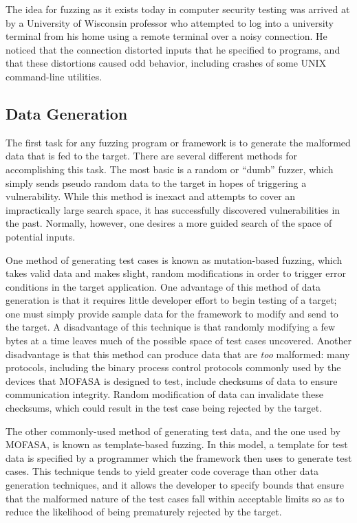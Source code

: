 \documentclass{report}
\begin{document}
The idea for fuzzing as it exists today in computer security testing was arrived at by a University of Wisconsin professor who
attempted to log into a university terminal from his home using a remote terminal over a noisy connection. He noticed that the
connection distorted inputs that he specified to programs, and that these distortions caused odd behavior, including crashes
of some UNIX command-line utilities.

\subsection{Data Generation}
The first task for any fuzzing program or framework is to generate the malformed data that is fed to the target.
There are several different methods for accomplishing this task. The most basic is a random or ``dumb'' fuzzer,
which simply sends pseudo random data to the target in hopes of triggering a vulnerability. While this method
is inexact and attempts to cover an impractically large search space, it has successfully discovered vulnerabilities
in the past. Normally, however, one desires a more guided search of the space of potential inputs. 

One method of generating test cases is known as mutation-based fuzzing, which takes valid data and makes slight, 
random modifications in order to trigger error conditions in the target application. One advantage of this method
of data generation is that it requires little developer effort to begin testing of a target; one must simply provide
sample data for the framework to modify and send to the target. A disadvantage of this technique is that randomly
modifying a few bytes at a time leaves much of the possible space of test cases uncovered. Another disadvantage is that
this method can produce data that are \emph{too} malformed: many protocols, including the binary process control protocols
commonly used by the devices that MOFASA is designed to test, include checksums of data to ensure communication integrity.
Random modification of data can invalidate these checksums, which could result in the test case being rejected by the target.

The other commonly-used method of generating test data, and the one used by MOFASA, is known as template-based fuzzing. In this
model, a template for test data is specified by a programmer which the framework then uses to generate test cases. This technique
tends to yield greater code coverage than other data generation techniques, and it allows the developer to specify
bounds that ensure that the malformed nature of the test cases fall within acceptable limits so as to reduce the likelihood
of being prematurely rejected by the target.
\end{document}
